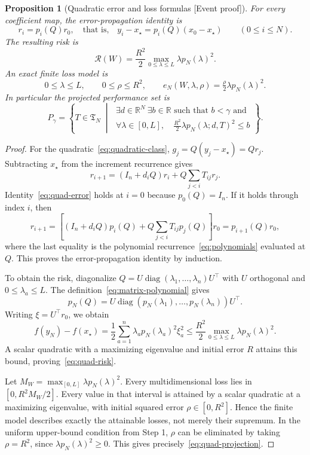 \documentclass[11pt]{article}
\newcommand{\supportlabel}[1]{\textcolor{blue!60!black}{\small\textsf{[#1]}}}
\newcommand{\eventproof}{\supportlabel{Event proof}}
\numberwithin{equation}{section}
\newtheorem{proposition}[theorem]{Proposition}
\theoremstyle{definition}
\newcommand{\R}{\mathbb R}
\newcommand{\risk}{\mathcal R}
\begin{document}
\begin{proposition}[Quadratic error and loss formulas \eventproof]\label{prop:quadratic-risk}
For every coefficient map, the error-propagation identity is
\begin{equation}
 r_i=p_i(Q)r_0,
 \quad\text{that is,}\quad
 y_i-x_\star=p_i(Q)(x_0-x_\star)
 \qquad(0\le i\le N).
 \label{eq:quad-error}
\end{equation}
The resulting risk is
\begin{equation}
 \risk(W)=\frac{R^2}{2}\max_{0\le\lambda\le L}\lambda p_N(\lambda)^2.
 \label{eq:quad-risk}
\end{equation}
An exact finite loss model is
\[
 0\le\lambda\le L,\qquad 0\le\rho\le R^2,\qquad
 e_N(W,\lambda,\rho)=\tfrac{\rho}{2}\lambda p_N(\lambda)^2.
\]
In particular the projected performance set is
\begin{equation}
 P_\gamma=\left\{T\in\mathfrak T_N\;\middle|\;
 \begin{array}{l}
 \exists d\in\R^N\ \exists b\in\R\text{ such that }b<\gamma\text{ and}\\[2pt]
 \forall\lambda\in[0,L],\quad
       \tfrac{R^2}{2}\lambda p_N(\lambda;d,T)^2\le b
 \end{array}
 \right\}.
 \label{eq:quad-projection}
\end{equation}
\end{proposition}
\begin{proof}
For the quadratic~\eqref{eq:quadratic-class}, $g_j=Q(y_j-x_\star)=Qr_j$. Subtracting $x_\star$ from the increment recurrence gives
\[
 r_{i+1}=(I_n+d_iQ)r_i+Q\sum_{j<i}T_{ij}r_j.
\]
Identity~\eqref{eq:quad-error} holds at $i=0$ because $p_0(Q)=I_n$. If it holds through index $i$, then
\[
 r_{i+1}
 =\left[(I_n+d_iQ)p_i(Q)+Q\sum_{j<i}T_{ij}p_j(Q)\right]r_0
 =p_{i+1}(Q)r_0,
\]
where the last equality is the polynomial recurrence~\eqref{eq:polynomials} evaluated at $Q$. This proves the error-propagation identity by induction.

To obtain the risk, diagonalize $Q=U\operatorname{diag}(\lambda_1,\ldots,\lambda_n)U^\top$ with $U$ orthogonal and $0\le\lambda_a\le L$. The definition~\eqref{eq:matrix-polynomial} gives
\[
 p_N(Q)=U\operatorname{diag}(p_N(\lambda_1),\ldots,p_N(\lambda_n))U^\top.
\]
Writing $\xi=U^\top r_0$, we obtain
\[
 f(y_N)-f(x_\star)
 =\frac12\sum_{a=1}^n\lambda_a p_N(\lambda_a)^2\xi_a^2
 \le\frac{R^2}{2}\max_{0\le\lambda\le L}\lambda p_N(\lambda)^2.
\]
A scalar quadratic with a maximizing eigenvalue and initial error $R$ attains this bound, proving~\eqref{eq:quad-risk}.

Let $M_W=\max_{[0,L]}\lambda p_N(\lambda)^2$. Every multidimensional loss lies in $[0,R^2M_W/2]$. Every value in that interval is attained by a scalar quadratic at a maximizing eigenvalue, with initial squared error $\rho\in[0,R^2]$. Hence the finite model describes exactly the attainable losses, not merely their supremum. In the uniform upper-bound condition from Step 1, $\rho$ can be eliminated by taking $\rho=R^2$, since $\lambda p_N(\lambda)^2\ge0$. This gives precisely~\eqref{eq:quad-projection}.
\end{proof}
\end{document}
